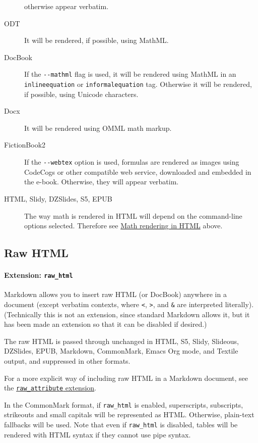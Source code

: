 \documentclass[
]{article}
\begin{document}
\begin{description}
otherwise appear verbatim.
\item[ODT]
It will be rendered, if possible, using MathML.
\item[DocBook]
If the \texttt{-\/-mathml} flag is used, it will be rendered using
MathML in an \texttt{inlineequation} or \texttt{informalequation} tag.
Otherwise it will be rendered, if possible, using Unicode characters.
\item[Docx]
It will be rendered using OMML math markup.
\item[FictionBook2]
If the \texttt{-\/-webtex} option is used, formulas are rendered as
images using CodeCogs or other compatible web service, downloaded and
embedded in the e-book. Otherwise, they will appear verbatim.
\item[HTML, Slidy, DZSlides, S5, EPUB]
The way math is rendered in HTML will depend on the command-line options
selected. Therefore see \protect\hyperlink{math-rendering-in-html}{Math
rendering in HTML} above.
\end{description}

\hypertarget{raw-html}{%
\subsection{Raw HTML}\label{raw-html}}

\hypertarget{extension-raw_html}{%
\paragraph{\texorpdfstring{Extension:
\texttt{raw\_html}}{Extension: raw\_html}}\label{extension-raw_html}}

Markdown allows you to insert raw HTML (or DocBook) anywhere in a
document (except verbatim contexts, where \texttt{\textless{}},
\texttt{\textgreater{}}, and \texttt{\&} are interpreted literally).
(Technically this is not an extension, since standard Markdown allows
it, but it has been made an extension so that it can be disabled if
desired.)

The raw HTML is passed through unchanged in HTML, S5, Slidy, Slideous,
DZSlides, EPUB, Markdown, CommonMark, Emacs Org mode, and Textile
output, and suppressed in other formats.

For a more explicit way of including raw HTML in a Markdown document,
see the
\protect\hyperlink{extension-raw_attribute}{\texttt{raw\_attribute}
extension}.

In the CommonMark format, if \texttt{raw\_html} is enabled,
superscripts, subscripts, strikeouts and small capitals will be
represented as HTML. Otherwise, plain-text fallbacks will be used. Note
that even if \texttt{raw\_html} is disabled, tables will be rendered
with HTML syntax if they cannot use pipe syntax.
\end{document}
